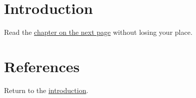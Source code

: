 \documentclass{article}
\begin{document}
\section{Introduction}\label{intro}
Read the \hyperref[chapter]{chapter on the next page} without losing your place.
\newpage

\newpage
\section{References}
Return to the \hyperref[intro]{introduction}.
\end{document}
